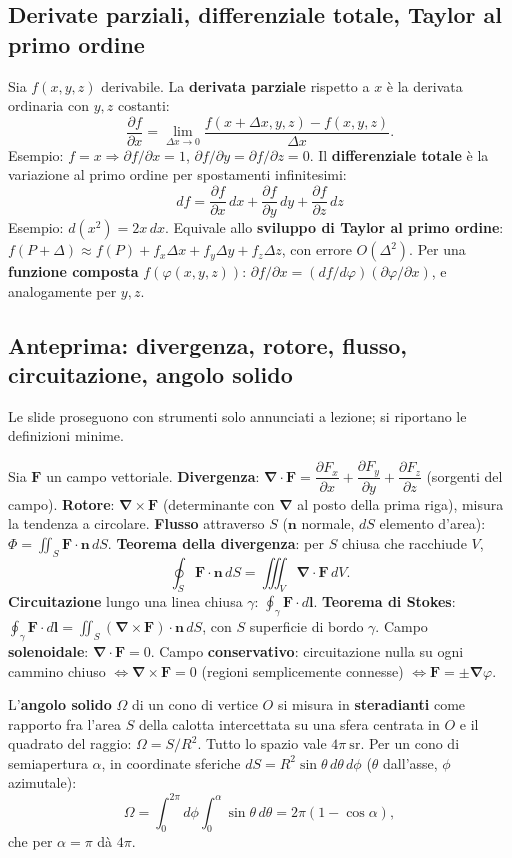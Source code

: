 \documentclass[11pt,a4paper]{article}
\newcommand{\vv}[1]{\mathbf{#1}}
\newcommand{\pd}[2]{\dfrac{\partial #1}{\partial #2}}
\newcommand{\oiint}{\oint}
\newcommand{\unit}[1]{\ \mathrm{#1}}
\newcommand{\nab}{\boldsymbol{\nabla}}
\begin{document}
\subsection{Derivate parziali, differenziale totale, Taylor al primo ordine}
\begin{richiamo}
Sia $f(x,y,z)$ derivabile. La \textbf{derivata parziale} rispetto a $x$ è la derivata ordinaria con $y,z$ costanti:
\[
\pd fx=\lim_{\Delta x\to0}\frac{f(x+\Delta x,y,z)-f(x,y,z)}{\Delta x}.
\]
Esempio: $f=x\Rightarrow\partial f/\partial x=1$, $\partial f/\partial y=\partial f/\partial z=0$. Il \textbf{differenziale totale} è la variazione al primo ordine per spostamenti infinitesimi:
\begin{equation}
df=\pd fx\,dx+\pd fy\,dy+\pd fz\,dz
\end{equation}
Esempio: $d(x^2)=2x\,dx$. Equivale allo \textbf{sviluppo di Taylor al primo ordine}: $f(P+\Delta)\approx f(P)+f_x\Delta x+f_y\Delta y+f_z\Delta z$, con errore $O(\Delta^2)$. Per una \textbf{funzione composta} $f(\varphi(x,y,z))$: $\partial f/\partial x=(df/d\varphi)(\partial\varphi/\partial x)$, e analogamente per $y,z$.
\end{richiamo}

\subsection{Anteprima: divergenza, rotore, flusso, circuitazione, angolo solido}
Le slide proseguono con strumenti solo annunciati a lezione; si riportano le definizioni minime.
\begin{richiamo}
Sia $\vv F$ un campo vettoriale. \textbf{Divergenza}: $\nab\cdot\vv F=\pd{F_x}x+\pd{F_y}y+\pd{F_z}z$ (sorgenti del campo). \textbf{Rotore}: $\nab\times\vv F$ (determinante con $\nab$ al posto della prima riga), misura la tendenza a circolare. \textbf{Flusso} attraverso $S$ ($\vv n$ normale, $dS$ elemento d'area): $\Phi=\iint_S\vv F\cdot\vv n\,dS$. \textbf{Teorema della divergenza}: per $S$ chiusa che racchiude $V$,
\[
\oiint_S\vv F\cdot\vv n\,dS=\iiint_V\nab\cdot\vv F\,dV .
\]
\textbf{Circuitazione} lungo una linea chiusa $\gamma$: $\oint_\gamma\vv F\cdot d\vv l$. \textbf{Teorema di Stokes}: $\oint_\gamma\vv F\cdot d\vv l=\iint_S(\nab\times\vv F)\cdot\vv n\,dS$, con $S$ superficie di bordo $\gamma$. Campo \textbf{solenoidale}: $\nab\cdot\vv F=0$. Campo \textbf{conservativo}: circuitazione nulla su ogni cammino chiuso $\iff\nab\times\vv F=0$ (regioni semplicemente connesse) $\iff\vv F=\pm\nab\varphi$.
\end{richiamo}
\begin{richiamo}
L'\textbf{angolo solido} $\Omega$ di un cono di vertice $O$ si misura in \textbf{steradianti} come rapporto fra l'area $S$ della calotta intercettata su una sfera centrata in $O$ e il quadrato del raggio: $\Omega=S/R^2$. Tutto lo spazio vale $4\pi\unit{sr}$. Per un cono di semiapertura $\alpha$, in coordinate sferiche $dS=R^2\sin\theta\,d\theta\,d\phi$ ($\theta$ dall'asse, $\phi$ azimutale):
\[
\Omega=\int_0^{2\pi}\!d\phi\int_0^{\alpha}\sin\theta\,d\theta=2\pi(1-\cos\alpha),
\]
che per $\alpha=\pi$ dà $4\pi$.
\end{richiamo}
\end{document}
